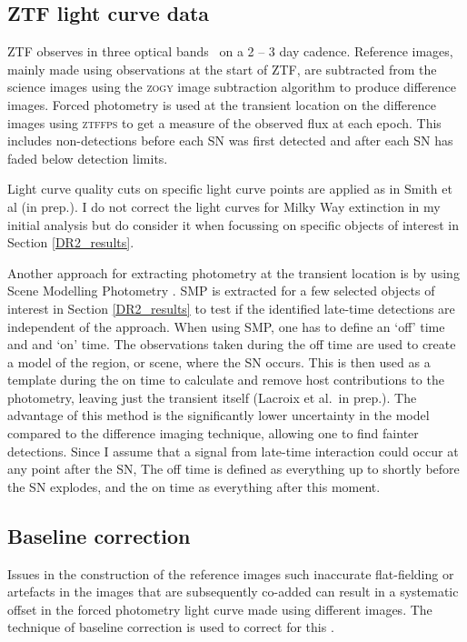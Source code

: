 \documentclass[a4paper,oneside,12pt, class=Latex/Classes/PhDthesisPSnPDF, crop=false]{standalone}
\begin{document}
\subsection{ZTF light curve data}
\label{lc_data}
ZTF observes in three optical bands \ztfg\ztfr\ztfi\ on a 2 -- 3 day cadence. Reference images, mainly made using observations at the start of ZTF, are subtracted from the science images using the \textsc{zogy} image subtraction algorithm \citep{ZOGY} to produce difference images. Forced photometry is used at the transient location on the difference images using \textsc{ztffps} \citep{ztffps} to get a measure of the observed flux at each epoch. This includes non-detections before each SN was first detected and after each SN has faded below detection limits.

 Light curve quality cuts on specific light curve points are applied as in Smith et al (in prep.). I do not correct the light curves for Milky Way extinction in my initial analysis but do consider it when focussing on specific objects of interest in Section \ref{DR2_results}. 

Another approach for extracting photometry at the transient location is by using Scene Modelling Photometry \citep[SMP;][]{Holtzmann_SMP}. SMP is extracted for a few selected objects of interest in Section \ref{DR2_results} to test if the identified late-time detections are independent of the approach. When using SMP, one has to define an `off' time and and `on' time. The observations taken during the off time are used to create a model of the region, or scene, where the SN occurs. This is then used as a template during the on time to calculate and remove host contributions to the photometry, leaving just the transient itself (Lacroix et al.~in prep.). The advantage of this method is the significantly lower uncertainty in the model compared to the difference imaging technique, allowing one to find fainter detections. Since I assume that a signal from late-time interaction could occur at any point after the SN, The off time is defined as everything up to shortly before the SN explodes, and the on time as everything after this moment.


\subsection{Baseline correction}
 Issues in the construction of the reference images such inaccurate flat-fielding or artefacts in the images that are subsequently co-added can result in a systematic offset in the forced photometry light curve made using different images. The technique of baseline correction is used to correct for this \citep{Yao_baseline_corr,Miller_baseline_corr}. 
\end{document}
